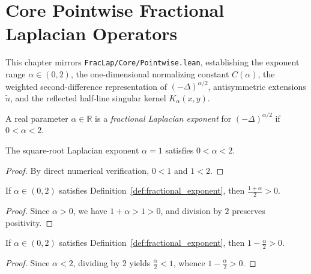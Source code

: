 \chapter{Core Pointwise Fractional Laplacian Operators}

This chapter mirrors \texttt{FracLap/Core/Pointwise.lean}, establishing the exponent range $\alpha \in (0, 2)$, the one-dimensional normalizing constant $C(\alpha)$, the weighted second-difference representation of $(-\Delta)^{\alpha/2}$, antisymmetric extensions $\widetilde{u}$, and the reflected half-line singular kernel $K_\alpha(x, y)$.

\begin{definition}\label{def:fractional_exponent}
\leanok
A real parameter $\alpha \in \mathbb{R}$ is a \emph{fractional Laplacian exponent} for $(-\Delta)^{\alpha/2}$ if $0 < \alpha < 2$.
\end{definition}

\begin{theorem}\label{thm:fractional_exponent_one}
\leanok
The square-root Laplacian exponent $\alpha = 1$ satisfies $0 < \alpha < 2$.
\end{theorem}

\begin{proof}
\leanok
By direct numerical verification, $0 < 1$ and $1 < 2$.
\end{proof}

\begin{lemma}\label{lem:half_one_add_pos}
\leanok
If $\alpha \in (0, 2)$ satisfies Definition~\ref{def:fractional_exponent}, then $\frac{1 + \alpha}{2} > 0$.
\end{lemma}

\begin{proof}
\leanok
Since $\alpha > 0$, we have $1 + \alpha > 1 > 0$, and division by $2$ preserves positivity.
\end{proof}

\begin{lemma}\label{lem:one_sub_half_pos}
\leanok
If $\alpha \in (0, 2)$ satisfies Definition~\ref{def:fractional_exponent}, then $1 - \frac{\alpha}{2} > 0$.
\end{lemma}

\begin{proof}
\leanok
Since $\alpha < 2$, dividing by $2$ yields $\frac{\alpha}{2} < 1$, whence $1 - \frac{\alpha}{2} > 0$.
\end{proof}

